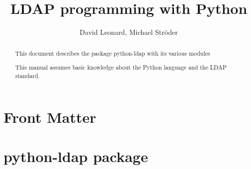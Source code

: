 \documentclass{manual}
\title{LDAP programming with Python}
\author{David Leonard, Michael Str\"oder}
\begin{document}
\maketitle

\ifhtml
\chapter*{Front Matter\label{front}}
\fi

\begin{abstract}
\noindent
This document describes the package python-ldap with its various modules

This manual assumes basic knowledge about the Python language and the
LDAP standard.
\end{abstract}

\tableofcontents

\chapter{python-ldap package}










\renewcommand{\indexname}{Module Index}

\renewcommand{\indexname}{Index}
\end{document}
